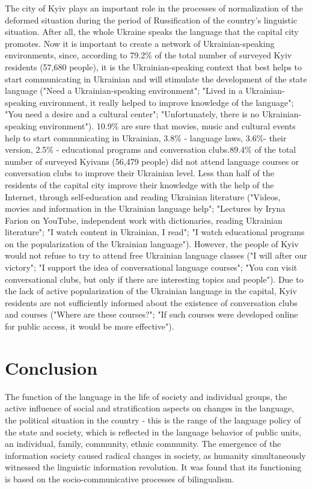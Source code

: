 \documentclass[english]{textolivre}
\begin{document}
The city of Kyiv plays an important role in the processes of normalization of the deformed situation during the period of Russification of the country's linguistic situation. After all, the whole Ukraine speaks the language that the capital city promotes. Now it is important to create a network of Ukrainian-speaking environments, since, according to 79.2\% of the total number of surveyed Kyiv residents (57,680 people), it is the Ukrainian-speaking context that best helps to start communicating in Ukrainian and will stimulate the development of the state language ("Need a Ukrainian-speaking environment"; "Lived in a Ukrainian-speaking environment, it really helped to improve knowledge of the language"; "You need a desire and a cultural center"; "Unfortunately, there is no Ukrainian-speaking environment"). 10.9\% are sure that movies, music and cultural events help to start communicating in Ukrainian, 3.8\% - language laws, 3.6\%- their version, 2.5\% - educational programs and conversation clubs.89.4\% of the total number of surveyed Kyivans (56,479 people) did not attend language courses or conversation clubs to improve their Ukrainian level. Less than half of the residents of the capital city improve their knowledge with the help of the Internet, through self-education and reading Ukrainian literature ("Videos, movies and information in the Ukrainian language help"; "Lectures by Iryna Farion on YouTube, independent work with dictionaries, reading Ukrainian literature"; "I watch content in Ukrainian, I read"; "I watch educational programs on the popularization of the Ukrainian language"). However, the people of Kyiv would not refuse to try to attend free Ukrainian language classes ("I will after our victory"; "I support the idea of ​​conversational language courses"; "You can visit conversational clubs, but only if there are interesting topics and people"). Due to the lack of active popularization of the Ukrainian language in the capital, Kyiv residents are not sufficiently informed about the existence of conversation clubs and courses ("Where are these courses?"; "If such courses were developed online for public access, it would be more effective").

\section{Conclusion}
The function of the language in the life of society and individual groups, the active influence of social and stratification aspects on changes in the language, the political situation in the country - this is the range of the language policy of the state and society, which is reflected in the language behavior of public units, an individual, family, community, ethnic community. The emergence of the information society caused radical changes in society, as humanity simultaneously witnessed the linguistic information revolution. It was found that its functioning is based on the socio-communicative processes of bilingualism.
\end{document}
